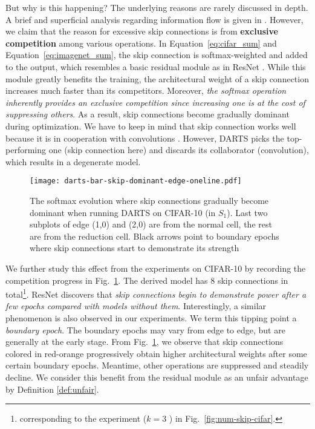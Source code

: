 \documentclass[runningheads]{llncs}
\begin{document}
But why is this happening? The underlying reasons are rarely discussed in depth. A brief and superficial analysis regarding information flow is given in \cite{chen2019progressive}. However, we claim that the reason for excessive skip connections is from \textbf{exclusive competition} among various operations. In Equation~\ref{eq:cifar_sum} and Equation~\ref{eq:imagenet_sum}, the skip connection is softmax-weighted and added to the output, which resembles a basic residual module as in ResNet \cite{he2016deep}. While this module greatly benefits the training, the architectural weight of a skip connection increases much faster than its competitors. Moreover,  \emph{the softmax operation inherently provides an exclusive competition since increasing one is at the cost of suppressing others}. As a result, skip connections become gradually dominant during optimization.  
We have to keep in mind that skip connection works well because it is in cooperation with convolutions \cite{he2016deep}. 
However, DARTS picks the top-performing one (skip connection here) and discards its collaborator (convolution), which results in a degenerate model.

\begin{figure}[ht]
	\centering
	\texttt{[image: darts-bar-skip-dominant-edge-oneline.pdf]}
\caption{The softmax evolution where skip connections gradually become dominant when running DARTS on CIFAR-10 (in $S_1$).  Last two subplots of edge (1,0) and (2,0) are from the normal cell, the rest are from the reduction cell. Black arrows point to boundary epochs where skip connections start to demonstrate its strength}
	\label{fig:darts-bar-skip-dominant-edge}
\end{figure}

We further study this effect from the experiments on CIFAR-10 by recording the competition progress in Fig.~\ref{fig:darts-bar-skip-dominant-edge}. The derived model has 8 skip connections in total\footnote{corresponding to the experiment ($k=3$ ) in Fig.~\ref{fig:num-skip-cifar}.}. ResNet \cite{he2016deep} discovers that \emph{skip connections begin to demonstrate power after a few epochs compared with models without them}. Interestingly, a similar phenomenon  is also observed in our experiments. We term this tipping point a \emph{boundary epoch}. The boundary epochs may vary from edge to edge, but are generally at the early stage. From Fig.~\ref{fig:darts-bar-skip-dominant-edge}, we observe that skip connections colored in red-orange progressively obtain higher architectural weights after some certain boundary epochs. Meantime, other operations are suppressed and steadily decline. We consider this benefit from the residual module as an unfair advantage by Definition \ref{def:unfair}.
\end{document}
